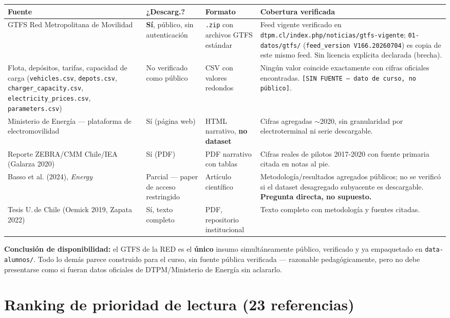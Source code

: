 \documentclass[11pt,a4paper,parskip=half]{scrartcl}
\begin{document}
\begin{longtable}{@{}p{3.1cm}p{1.6cm}p{3.4cm}p{6.7cm}@{}}
\toprule
\textbf{Fuente} & \textbf{¿Descarg.?} & \textbf{Formato} & \textbf{Cobertura verificada} \\
\midrule
\endhead
GTFS Red Metropolitana de Movilidad & \textcolor{ink}{\textbf{Sí}}, público, sin autenticación & \texttt{.zip} con archivos GTFS estándar & Feed vigente verificado en \texttt{dtpm.cl/index.php/noticias/gtfs-vigente}; \texttt{01-datos/gtfs/} (\texttt{feed\_version V166.20260704}) es copia de este mismo feed. Sin licencia explícita declarada (brecha). \\
\addlinespace
Flota, depósitos, tarifas, capacidad de carga (\texttt{vehicles.csv}, \texttt{depots.csv}, \texttt{charger\_capacity.csv}, \texttt{electricity\_prices.csv}, \texttt{parameters.csv}) & No verificado como público & CSV con valores redondos & Ningún valor coincide exactamente con cifras oficiales encontradas. \texttt{[SIN FUENTE --- dato de curso, no público]}. \\
\addlinespace
Ministerio de Energía --- plataforma de electromovilidad & Sí (página web) & HTML narrativo, \textbf{no dataset} & Cifras agregadas $\sim$2020, sin granularidad por electroterminal ni serie descargable. \\
\addlinespace
Reporte ZEBRA/CMM Chile/IEA (Galarza 2020) & Sí (PDF) & PDF narrativo con tablas & Cifras reales de pilotos 2017-2020 con fuente primaria citada en notas al pie. \\
\addlinespace
Basso et al. (2024), \textit{Energy} & Parcial --- paper de acceso restringido & Artículo científico & Metodología/resultados agregados públicos; no se verificó si el dataset desagregado subyacente es descargable. \textbf{Pregunta directa, no supuesto.} \\
\addlinespace
Tesis U.\,de Chile (Oemick 2019, Zapata 2022) & Sí, texto completo & PDF, repositorio institucional & Texto completo con metodología y fuentes citadas. \\
\bottomrule
\end{longtable}

\textbf{Conclusión de disponibilidad:} el GTFS de la RED es el \textbf{único} insumo simultáneamente público, verificado y ya empaquetado en \texttt{data-alumnos/}. Todo lo demás parece construido para el curso, sin fuente pública verificada --- razonable pedagógicamente, pero no debe presentarse como si fueran datos oficiales de DTPM/Ministerio de Energía sin aclararlo.

\section*{Ranking de prioridad de lectura (23 referencias)}
\end{document}
